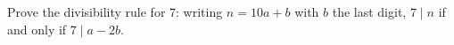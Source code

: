 Prove the divisibility rule for $7$: writing $n=10a+b$ with $b$ the last digit, $7\mid n$ if and only if $7\mid a-2b$.
